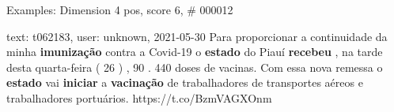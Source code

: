 \begin{frame}{Examples: Dimension 4 pos, score 6, \# 000012}
\footnotesize
\begin{exampleblock}{text: t062183, user: unknown, 2021-05-30}
Para proporcionar a continuidade da minha \textbf{imunização} contra a Covid-19 
o \textbf{estado} do Piauí \textbf{recebeu} , na tarde desta quarta-feira ( 26 
) , 90 . 440 doses de vacinas. Com essa nova remessa o \textbf{estado} vai 
\textbf{iniciar} a \textbf{vacinação} de trabalhadores de transportes aéreos e 
trabalhadores portuários. https://t.co/BzmVAGXOnm 
\end{exampleblock}
\end{frame}
